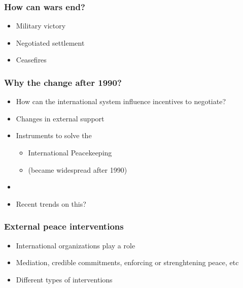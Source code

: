 \documentclass[aspectratio=43]{beamer}
\begin{document}

\begin{frame}
\frametitle{How can wars end?}
\centering

\begin{itemize}[<+->]
  \item Military victory
  \item Negotiated settlement
  \item Ceasefires
\end{itemize}

\end{frame}


\begin{frame}
\frametitle{Why the change after 1990?}
\centering

\begin{itemize}
  \item How can the international system influence incentives to negotiate?
  \item<2->[1.] Changes in external support
  \item<3->[2.] Instruments to solve the {\color{red}{credible commitment problem}}
  \begin{itemize}
    \item International Peacekeeping
    \item[] (became widespread after 1990)
  \end{itemize}
  \item<4->[]
  \item<4-> Recent trends on this?
\end{itemize}

\end{frame}

\begin{frame}
\frametitle{External peace interventions}
\centering

\begin{itemize}
  \item International organizations play a role
  \item Mediation, credible commitments, enforcing or strenghtening peace, etc
  \item Different types of interventions
\end{itemize}

\end{frame}
\end{document}
